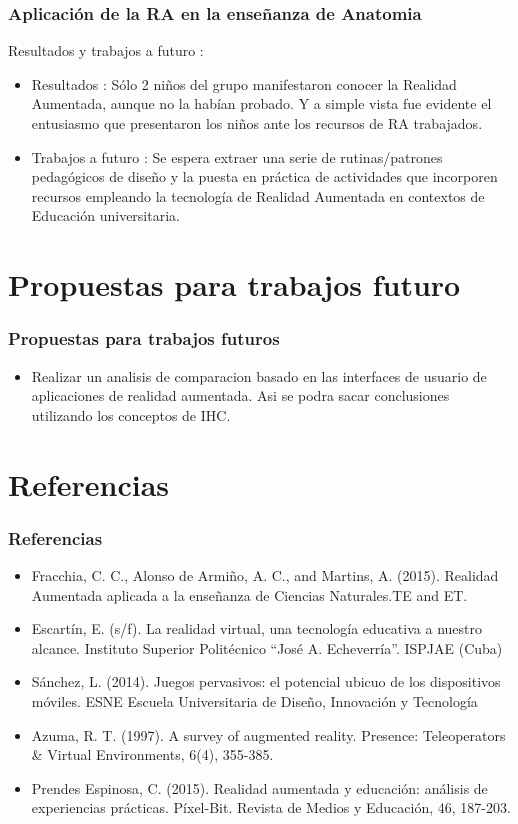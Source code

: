 \documentclass[11pt]{beamer}
\begin{document}
\begin{frame}
\frametitle{Aplicación de la RA en la enseñanza de Anatomia}
\center Resultados y trabajos a futuro : 
\begin{itemize}
\item Resultados : Sólo 2 niños del grupo manifestaron conocer la Realidad
Aumentada, aunque no la habían probado. Y a simple vista fue
evidente el entusiasmo que presentaron los niños ante los
recursos de RA trabajados.
\item Trabajos a futuro : Se espera extraer una serie de rutinas/patrones pedagógicos de diseño
y la puesta en práctica de actividades que incorporen
recursos empleando la tecnología de Realidad Aumentada
en contextos de Educación universitaria. 
\end{itemize}
\end{frame}

\section{Propuestas para trabajos futuro}
\begin{frame}
\frametitle{Propuestas para trabajos futuros}
\begin{itemize}
\item Realizar un analisis de comparacion basado en las interfaces de usuario de aplicaciones de realidad aumentada. Asi se podra sacar conclusiones utilizando los conceptos de IHC.
\end{itemize}
\end{frame}

\section{Referencias}
\begin{frame}
\frametitle{Referencias}
\begin{itemize}
\item Fracchia, C. C., Alonso de Armiño, A. C., and Martins, A. (2015). Realidad Aumentada aplicada a la enseñanza de Ciencias Naturales.TE  and   ET.
\item Escartín, E. (s/f). La realidad virtual, una tecnología educativa a nuestro alcance. Instituto Superior Politécnico “José A. Echeverría”.
ISPJAE (Cuba)
\item Sánchez, L. (2014). Juegos pervasivos: el potencial ubicuo de los dispositivos móviles. ESNE Escuela Universitaria de Diseño, Innovación y Tecnología
\item Azuma, R. T. (1997). A survey of augmented reality. Presence: Teleoperators & Virtual Environments, 6(4), 355-385.
\item Prendes Espinosa, C. (2015). Realidad aumentada y educación: análisis de experiencias prácticas. Píxel-Bit. Revista de Medios y Educación, 46, 187-203.
\end{itemize}
\end{frame}
\end{document}
